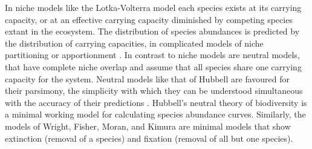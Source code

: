 In niche models like the Lotka-Volterra model each species exists at its carrying capacity, or at an effective carrying capacity diminished by competing species extant in the ecosystem. 
The distribution of species abundances is predicted by the distribution of carrying capacities, in complicated models of niche partitioning or apportionment \cite{MacArthur1957,Sugihara2003,Leibold1995}. 
In contrast to niche models are neutral models, that have complete niche overlap and assume that all species share one carrying capacity for the system. 
Neutral models like that of Hubbell are favoured for their parsimony, the simplicity with which they can be understood simultaneous with the accuracy of their predictions \cite{Bell2001,Hubbell2001,Leibold2006,Rosindell2011}. 
Hubbell's neutral theory of biodiversity is a minimal working model for calculating species abundance curves. 
Similarly, the models of Wright, Fisher, Moran, and Kimura are minimal models that show extinction (removal of a species) and fixation (removal of all but one species). 
%
